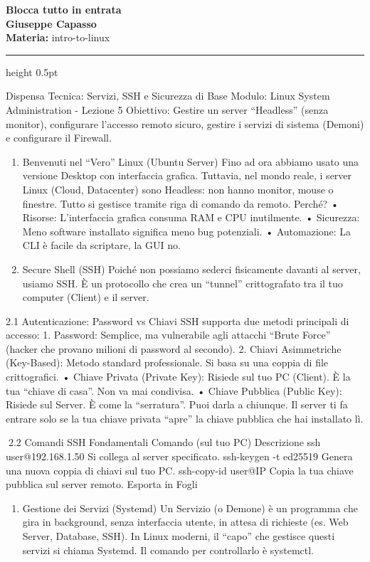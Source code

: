 \documentclass[11pt,a4paper]{article}
\providecommand{\tightlist}{%
  \setlength{\itemsep}{0pt}\setlength{\parskip}{0pt}}
\newcommand{\proposaltitle}[1]{
    \begin{center}
        \vspace*{0.1cm}
        {\LARGE \bfseries \color{blue} #1} \\[1.5ex]
        {\large \textbf{Giuseppe Capasso}} \\[1ex]
                \small{
            \vspace{0.1cm}
            \textbf{Materia:} intro-to-linux\\
        }
            \end{center}
    \vspace{0.3cm}
    \hrule height 0.5pt
    \vspace{0.5cm}
}
\begin{document}
\proposaltitle{Blocca tutto in entrata}

Dispensa Tecnica: Servizi, SSH e Sicurezza di Base Modulo: Linux System
Administration - Lezione 5 Obiettivo: Gestire un server ``Headless''
(senza monitor), configurare l'accesso remoto sicuro, gestire i servizi
di sistema (Demoni) e configurare il Firewall.

\begin{enumerate}
\def\labelenumi{\arabic{enumi}.}
\item
  Benvenuti nel ``Vero'' Linux (Ubuntu Server) Fino ad ora abbiamo usato
  una versione Desktop con interfaccia grafica. Tuttavia, nel mondo
  reale, i server Linux (Cloud, Datacenter) sono Headless: non hanno
  monitor, mouse o finestre. Tutto si gestisce tramite riga di comando
  da remoto. Perché? • Risorse: L'interfaccia grafica consuma RAM e CPU
  inutilmente. • Sicurezza: Meno software installato significa meno bug
  potenziali. • Automazione: La CLI è facile da scriptare, la GUI no.
\item
  Secure Shell (SSH) Poiché non possiamo sederci fisicamente davanti al
  server, usiamo SSH. È un protocollo che crea un ``tunnel''
  crittografato tra il tuo computer (Client) e il server.
\end{enumerate}

2.1 Autenticazione: Password vs Chiavi SSH supporta due metodi
principali di accesso: 1. Password: Semplice, ma vulnerabile agli
attacchi ``Brute Force'' (hacker che provano milioni di password al
secondo). 2. Chiavi Asimmetriche (Key-Based): Metodo standard
professionale. Si basa su una coppia di file crittografici. • Chiave
Privata (Private Key): Risiede sul tuo PC (Client). È la tua ``chiave di
casa''. Non va mai condivisa. • Chiave Pubblica (Public Key): Risiede
sul Server. È come la ``serratura''. Puoi darla a chiunque. Il server ti
fa entrare solo se la tua chiave privata ``apre'' la chiave pubblica che
hai installato lì.

2.2 Comandi SSH Fondamentali Comando (sul tuo PC) Descrizione ssh
user@192.168.1.50 Si collega al server specificato. ssh-keygen -t
ed25519 Genera una nuova coppia di chiavi sul tuo PC. ssh-copy-id
user@IP Copia la tua chiave pubblica sul server remoto. Esporta in Fogli

\begin{enumerate}
\def\labelenumi{\arabic{enumi}.}
\setcounter{enumi}{2}
\tightlist
\item
  Gestione dei Servizi (Systemd) Un Servizio (o Demone) è un programma
  che gira in background, senza interfaccia utente, in attesa di
  richieste (es. Web Server, Database, SSH). In Linux moderni, il
  ``capo'' che gestisce questi servizi si chiama Systemd. Il comando per
  controllarlo è systemctl.
\end{enumerate}
\end{document}
